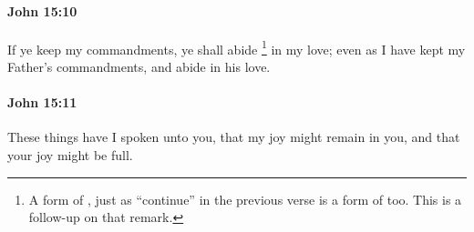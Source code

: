 		\paragraph{John 15:10} %
			\label{JOHN-15-10}

			If ye keep my commandments, ye shall abide%
				\footnote{%
					A form of , just as ``continue'' in the previous verse is a form of  too. This is a follow-up on that remark.
					}
			in my love; even as I have kept my Father's commandments, and abide in his love.

			\begin{framed}
				\scriptsize
				\begin{compactdesc}
					\item[SBLG] 
				\end{compactdesc}
			\end{framed}

		\paragraph{John 15:11} %
			\label{JOHN-15-11}

			These things have I spoken unto you, that my joy might remain in you, and that your joy might be full.

